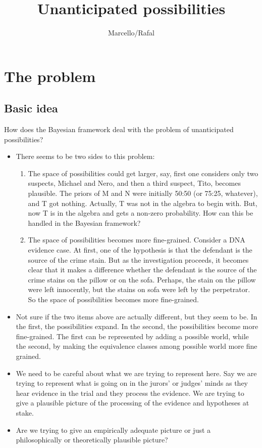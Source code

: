 \documentclass[
  11pt,
  dvipsnames,enabledeprecatedfontcommands]{scrartcl}
\title{Unanticipated possibilities}
\author{Marcello/Rafal}
\date{}
\begin{document}
\maketitle

\hypertarget{the-problem}{%
\section{The problem}\label{the-problem}}

\hypertarget{basic-idea}{%
\subsection{Basic idea}\label{basic-idea}}

How does the Bayesian framework deal with the problem of unanticipated
possibilities?

\begin{itemize}
\item
  There seems to be two sides to this problem:

  \begin{enumerate}
  \def\labelenumi{\alph{enumi}.}
  \item
    The space of possibilities could get larger, say, first one
    considers only two suspects, Michael and Nero, and then a third
    suspect, Tito, becomes plausible. The priors of M and N were
    initially 50:50 (or 75:25, whatever), and T got nothing. Actually, T
    was not in the algebra to begin with. But, now T is in the algebra
    and gets a non-zero probability. How can this be handled in the
    Bayesian framework?
  \item
    The space of possibilities becomes more fine-grained. Consider a DNA
    evidence case. At first, one of the hypothesis is that the defendant
    is the source of the crime stain. But as the investigation proceeds,
    it becomes clear that it makes a difference whether the defendant is
    the source of the crime stains on the pillow or on the sofa.
    Perhaps, the stain on the pillow were left innocently, but the
    stains on sofa were left by the perpetrator. So the space of
    possibilities becomes more fine-grained.
  \end{enumerate}
\item
  Not sure if the two items above are actually different, but they seem
  to be. In the first, the possibilities expand. In the second, the
  possibilities become more fine-grained. The first can be represented
  by adding a possible world, while the second, by making the
  equivalence classes among possible world more fine grained.
\item
  We need to be careful about what we are trying to represent here. Say
  we are trying to represent what is going on in the jurors' or judges'
  minds as they hear evidence in the trial and they process the
  evidence. We are trying to give a plausible picture of the processing
  of the evidence and hypotheses at stake.
\item
  Are we trying to give an empirically adequate picture or just a
  philosophically or theoretically plausible picture?
\end{itemize}
\end{document}
